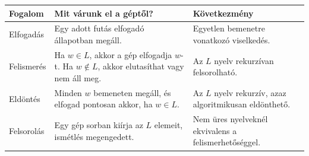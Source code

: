 \begin{tabularx}{\textwidth}{L{31mm}L{45mm}X}
\toprule
\textbf{Fogalom} & \textbf{Mit várunk el a géptől?} & \textbf{Következmény} \\
\midrule
Elfogadás & Egy adott futás elfogadó állapotban megáll. & Egyetlen bemenetre vonatkozó viselkedés. \\
Felismerés & Ha $w\in L$, akkor a gép elfogadja $w$-t. Ha $w\notin L$, akkor elutasíthat vagy nem áll meg. & Az $L$ nyelv rekurzívan felsorolható. \\
Eldöntés & Minden $w$ bemeneten megáll, és elfogad pontosan akkor, ha $w\in L$. & Az $L$ nyelv rekurzív, azaz algoritmikusan eldönthető. \\
Felsorolás & Egy gép sorban kiírja az $L$ elemeit, ismétlés megengedett. & Nem üres nyelveknél ekvivalens a felismerhetőséggel. \\
\bottomrule
\end{tabularx}
